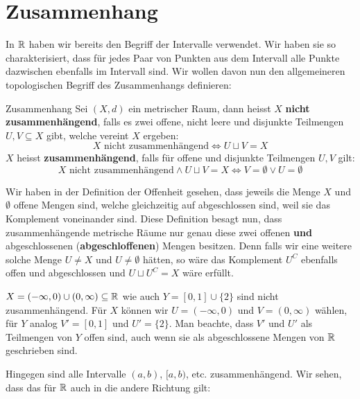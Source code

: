 \section{Zusammenhang}
In $\mathbb{R}$ haben wir bereits den Begriff der Intervalle verwendet. Wir haben sie so charakterisiert, dass für jedes Paar von Punkten aus dem Intervall alle Punkte dazwischen ebenfalls im Intervall sind. Wir wollen davon nun den allgemeineren topologischen Begriff des Zusammenhangs definieren:
\begin{definition}{Zusammenhang}{}
Sei $(X, d)$ ein metrischer Raum, dann heisst $X$ \textbf{nicht zusammenhängend}, falls es zwei offene, nicht leere und disjunkte Teilmengen $U, V \subseteq X$ gibt, welche vereint $X$ ergeben:
$$X \text{ nicht zusammenhängend} \iff U \sqcup V = X$$
$X$ heisst \textbf{zusammenhängend}, falls für offene und disjunkte Teilmengen $U, V$ gilt:
$$X \text{ nicht zusammenhängend} \land U \sqcup V = X \iff V = \emptyset \lor U = \emptyset$$
\end{definition}
Wir haben in der Definition der Offenheit gesehen, dass jeweils die Menge $X$ und $\emptyset$ offene Mengen sind, welche gleichzeitig auf abgeschlossen sind, weil sie das Komplement voneinander sind. Diese Definition besagt nun, dass zusammenhängende metrische Räume nur genau diese zwei offenen \textbf{und} abgeschlossenen (\textbf{abgeschloffenen}) Mengen besitzen. Denn falls wir eine weitere solche Menge $U \neq X$ und $U \neq \emptyset$ hätten, so wäre das Komplement $U^C$ ebenfalls offen und abgeschlossen und $U \sqcup U^C = X$ wäre erfüllt.

\begin{example}
$X = (-\infty, 0) \cup (0, \infty) \subseteq \mathbb{R}$ wie auch $Y = [0,1] \cup \{2\}$ sind nicht zusammenhängend. Für $X$ können wir $U = (-\infty, 0)$ und $V = (0, \infty)$ wählen, für $Y$ analog $V' = [0,1]$ und $U' = \{2\}$. Man beachte, dass $V'$ und $U'$ als Teilmengen von $Y$ offen sind, auch wenn sie als abgeschlossene Mengen von $\mathbb{R}$ geschrieben sind.
\end{example}

Hingegen sind alle Intervalle $(a,b)$, $[a,b)$, etc. zusammenhängend. Wir sehen, dass das für $\mathbb{R}$ auch in die andere Richtung gilt:

